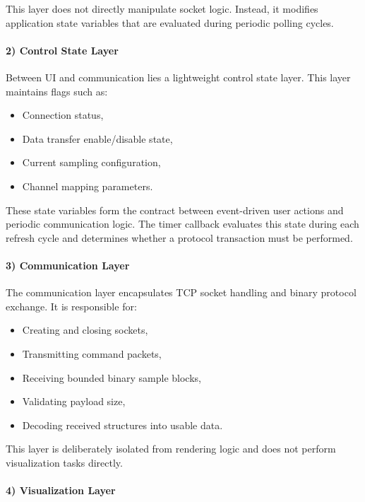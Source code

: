 This layer does not directly manipulate socket logic. Instead, it modifies application state variables that are evaluated during periodic polling cycles.

\paragraph{2) Control State Layer}

Between UI and communication lies a lightweight control state layer. This layer maintains flags such as:

\begin{itemize}
	\item Connection status,
	\item Data transfer enable/disable state,
	\item Current sampling configuration,
	\item Channel mapping parameters.
\end{itemize}

These state variables form the contract between event-driven user actions and periodic communication logic. The timer callback evaluates this state during each refresh cycle and determines whether a protocol transaction must be performed.

\paragraph{3) Communication Layer}

The communication layer encapsulates TCP socket handling and binary protocol exchange. It is responsible for:

\begin{itemize}
	\item Creating and closing sockets,
	\item Transmitting command packets,
	\item Receiving bounded binary sample blocks,
	\item Validating payload size,
	\item Decoding received structures into usable data.
\end{itemize}

This layer is deliberately isolated from rendering logic and does not perform visualization tasks directly.

\paragraph{4) Visualization Layer}

